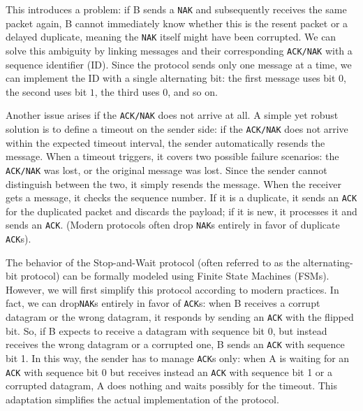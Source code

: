 This introduces a problem: if B sends a \texttt{NAK} and subsequently receives the same packet again, B cannot immediately know whether this is the resent packet or a delayed duplicate, meaning the \texttt{NAK} itself might have been corrupted.
We can solve this ambiguity by linking messages and their corresponding \texttt{ACK/NAK} with a sequence identifier (ID).
Since the protocol sends only one message at a time, we can implement the ID with a single alternating bit: the first message uses bit \( 0 \), the second uses bit \( 1 \), the third uses \( 0 \), and so on.

Another issue arises if the \texttt{ACK/NAK} does not arrive at all.
A simple yet robust solution is to define a timeout on the sender side: if the \texttt{ACK/NAK} does not arrive within the expected timeout interval, the sender automatically resends the message.
When a timeout triggers, it covers two possible failure scenarios: the \texttt{ACK/NAK} was lost, or the original message was lost.
Since the sender cannot distinguish between the two, it simply resends the message.
When the receiver gets a message, it checks the sequence number. If it is a duplicate, it sends an \texttt{ACK} for the duplicated packet and discards the payload; if it is new, it processes it and sends an \texttt{ACK}. (Modern protocols often drop \texttt{NAK}s entirely in favor of duplicate \texttt{ACK}s).

The behavior of the Stop-and-Wait protocol (often referred to as the alternating-bit protocol) can be formally modeled using Finite State Machines (FSMs).
However, we will first simplify this protocol according to modern practices. In fact, we can drop\texttt{NAK}s entirely in favor of \texttt{ACK}s: when B receives a corrupt datagram or the wrong datagram, it responds by sending an \texttt{ACK} with the flipped bit. So, if B expects to receive a datagram with sequence bit 0, but instead receives the wrong datagram or a corrupted one, B sends an \texttt{ACK} with sequence bit 1.
In this way, the sender has to manage \texttt{ACK}s only: when A is waiting for an \texttt{ACK} with sequence bit 0 but receives instead an \texttt{ACK} with sequence bit 1 or a corrupted datagram, A does nothing and waits possibly for the timeout.
This adaptation simplifies the actual implementation of the protocol.

